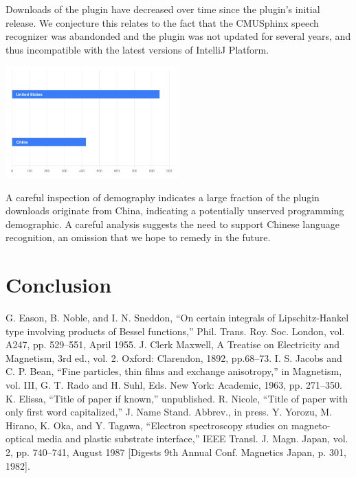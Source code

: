 \documentclass[conference]{IEEEtran}
\begin{document}
Downloads of the plugin have decreased over time since the plugin's initial release. We conjecture this relates to the fact that the CMUSphinx speech recognizer was abandonded and the plugin was not updated for several years, and thus incompatible with the latest versions of IntelliJ Platform.

\includegraphics[width=0.50\textwidth]{demographics.png}

A careful inspection of demography indicates a large fraction of the plugin downloads originate from China, indicating a potentially unserved programming demographic. A careful analysis suggests the need to support Chinese language recognition, an omission that we hope to remedy in the future.



\section{Conclusion}



\begin{thebibliography}{00}
 G. Eason, B. Noble, and I. N. Sneddon, ``On certain integrals of Lipschitz-Hankel type involving products of Bessel functions,'' Phil. Trans. Roy. Soc. London, vol. A247, pp. 529--551, April 1955.
 J. Clerk Maxwell, A Treatise on Electricity and Magnetism, 3rd ed., vol. 2. Oxford: Clarendon, 1892, pp.68--73.
 I. S. Jacobs and C. P. Bean, ``Fine particles, thin films and exchange anisotropy,'' in Magnetism, vol. III, G. T. Rado and H. Suhl, Eds. New York: Academic, 1963, pp. 271--350.
 K. Elissa, ``Title of paper if known,'' unpublished.
 R. Nicole, ``Title of paper with only first word capitalized,'' J. Name Stand. Abbrev., in press.
 Y. Yorozu, M. Hirano, K. Oka, and Y. Tagawa, ``Electron spectroscopy studies on magneto-optical media and plastic substrate interface,'' IEEE Transl. J. Magn. Japan, vol. 2, pp. 740--741, August 1987 [Digests 9th Annual Conf. Magnetics Japan, p. 301, 1982].
\end{thebibliography}
\end{document}
